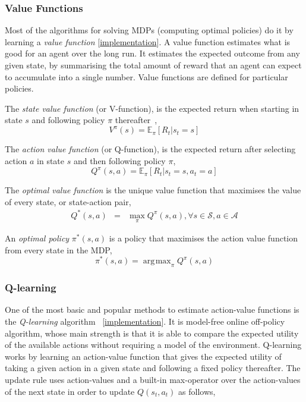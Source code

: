 \documentclass{article}
\DeclareMathOperator*{\argmax}{\arg\!\max}
\newcommand{\GithubURL}[1]{[\href{https://github.com/davidrobles/mlnd-capstone-code/blob/master/#1}{implementation}]}
\begin{document}
\subsubsection{Value Functions}

Most of the algorithms for solving MDPs (computing optimal policies) do it by learning a \emph{value
function} \GithubURL{capstone/rl/value_function.py}. A value function estimates what is good for an
agent over the long run. It estimates the expected outcome from any given state, by summarising the
total amount of reward that an agent can expect to accumulate into a single number. Value functions
are defined for particular policies.

The \emph{state value function} (or V-function), is the expected return when starting in state $s$
and following policy $\pi$ thereafter~\citep{Sutton1998RL},
%
\begin{equation}
V^\pi(s) = \mathbb{E}_\pi \left[R_t | s_t = s \right]
\end{equation}

The \emph{action value function} (or Q-function), is the expected return after selecting action $a$
in state $s$ and then following policy $\pi$,
%
\begin{equation}
Q^\pi(s,a) = \mathbb{E}_\pi \left[ R_t | s_t = s, a_t = a \right]
\end{equation}

The \emph{optimal value function} is the unique value function that maximises the value of every
state, or state-action pair,
%
\begin{eqnarray}
Q^*(s,a) & = & \max\limits_\pi Q^\pi(s,a), \forall s \in \mathcal{S}, a \in \mathcal{A}
\end{eqnarray}

An \emph{optimal policy} $\pi^*(s,a)$ is a policy that maximises the action value function from
every state in the MDP,
%
\begin{equation}
    \pi^*(s,a) = \argmax_\pi Q^\pi(s, a)
\end{equation}

\subsubsection{Q-learning}

One of the most basic and popular methods to estimate action-value functions is the
\emph{Q-learning} algorithm~\citep{Watkins1989PhD} \GithubURL{capstone/rl/learners/qlearning.py}.
It is model-free online off-policy algorithm, whose main strength is that it is able to compare the
expected utility of the available actions without requiring a model of the environment. Q-learning
works by learning an action-value function that gives the expected utility of taking a given action
in a given state and following a fixed policy thereafter. The update rule uses action-values and a
built-in max-operator over the action-values of the next state in order to update $Q(s_t, a_t)$ as
follows,
\end{document}

